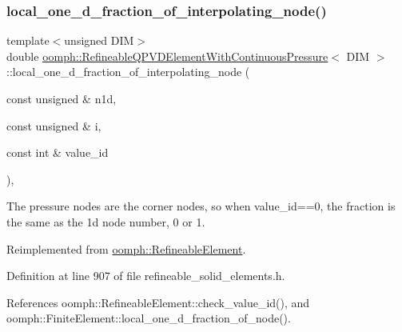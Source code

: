 \subsubsection{\texorpdfstring{local\+\_\+one\+\_\+d\+\_\+fraction\+\_\+of\+\_\+interpolating\+\_\+node()}{local\_one\_d\_fraction\_of\_interpolating\_node()}}
{\footnotesize\ttfamily template$<$unsigned D\+IM$>$ \\
double \hyperlink{classoomph_1_1RefineableQPVDElementWithContinuousPressure}{oomph\+::\+Refineable\+Q\+P\+V\+D\+Element\+With\+Continuous\+Pressure}$<$ D\+IM $>$\+::local\+\_\+one\+\_\+d\+\_\+fraction\+\_\+of\+\_\+interpolating\+\_\+node (\begin{DoxyParamCaption}\item[{const unsigned \&}]{n1d,  }\item[{const unsigned \&}]{i,  }\item[{const int \&}]{value\+\_\+id }\end{DoxyParamCaption})\hspace{0.3cm}{\ttfamily [inline]}, {\ttfamily [virtual]}}



The pressure nodes are the corner nodes, so when value\+\_\+id==0, the fraction is the same as the 1d node number, 0 or 1. 



Reimplemented from \hyperlink{classoomph_1_1RefineableElement_ac4e4ae5374154855ae9b072c6269f76e}{oomph\+::\+Refineable\+Element}.



Definition at line 907 of file refineable\+\_\+solid\+\_\+elements.\+h.



References oomph\+::\+Refineable\+Element\+::check\+\_\+value\+\_\+id(), and oomph\+::\+Finite\+Element\+::local\+\_\+one\+\_\+d\+\_\+fraction\+\_\+of\+\_\+node().

\mbox{\label{classoomph_1_1RefineableQPVDElementWithContinuousPressure_ace99412d0a2d0015ce56c3ee4c375254}} 

